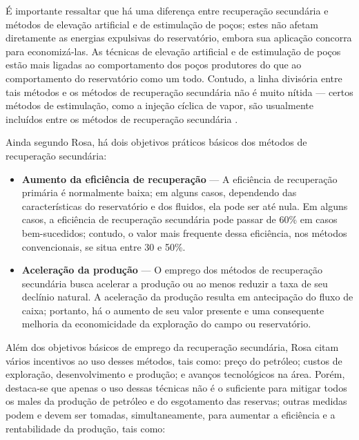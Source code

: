 É importante ressaltar que há uma diferença entre recuperação secundária e métodos de elevação artificial e de estimulação de poços; estes não afetam diretamente as energias expulsivas do reservatório, embora sua aplicação concorra para economizá-las. As técnicas de elevação artificial e de estimulação de poços estão mais ligadas ao comportamento dos poços produtores do que ao comportamento do reservatório como um todo. Contudo, a linha divisória entre tais métodos e os métodos de recuperação secundária não é muito nítida --- certos métodos de estimulação, como a injeção cíclica de vapor, são usualmente incluídos entre os métodos de recuperação secundária \cite{engres}.

Ainda segundo Rosa, há dois objetivos práticos básicos dos métodos de recuperação secundária:

\begin{itemize}
\item \textbf{Aumento da eficiência de recuperação} --- A eficiência de recuperação primária é normalmente baixa; em alguns casos, dependendo das características do reservatório e dos fluidos, ela pode ser até nula. Em alguns casos, a eficiência de recuperação secundária pode passar de 60\% em casos bem-sucedidos; contudo, o valor mais frequente dessa eficiência, nos métodos convencionais, se situa entre 30 e 50\%.
\item \textbf{Aceleração da produção} --- O emprego dos métodos de recuperação secundária busca acelerar a produção ou ao menos reduzir a taxa de seu declínio natural. A aceleração da produção resulta em antecipação do fluxo de caixa; portanto, há o aumento de seu valor presente e uma consequente melhoria da economicidade da exploração do campo ou reservatório.
\end{itemize}

Além dos objetivos básicos de emprego da recuperação secundária, Rosa citam vários incentivos ao uso desses métodos, tais como: preço do petróleo; custos de exploração, desenvolvimento e produção; e avanços tecnológicos na área. Porém, destaca-se que apenas o uso dessas técnicas não é o suficiente para mitigar todos os males da produção de petróleo e do esgotamento das reservas; outras medidas podem e devem ser tomadas, simultaneamente, para aumentar a eficiência e a rentabilidade da produção, tais como:

